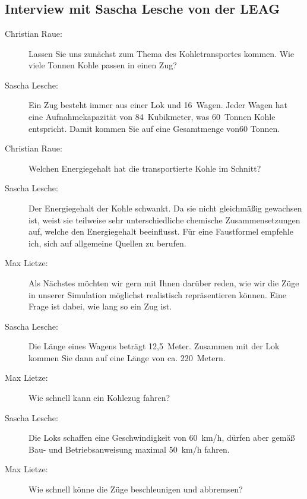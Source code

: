 \chapter{\appendixname}

\section*{Interview mit Sascha Lesche von der LEAG}

\begin{description}

    \item[Christian Raue:] Lassen Sie uns zunächst zum Thema des Kohletransportes kommen. Wie viele Tonnen Kohle passen in einen Zug?

    \item[Sascha Lesche:] Ein Zug besteht immer aus einer Lok und 16~Wagen. Jeder Wagen hat eine Aufnahmekapazität von 84~Kubikmeter, was 60~Tonnen Kohle entspricht. Damit kommen Sie auf eine Gesamtmenge von60 Tonnen.

    \item[Christian Raue:] Welchen Energiegehalt hat die transportierte Kohle im Schnitt?

    \item[Sascha Lesche:] Der Energiegehalt der Kohle schwankt. Da sie nicht gleichmäßig gewachsen ist, weist sie teilweise sehr unterschiedliche chemische Zusammensetzungen auf, welche den Energiegehalt beeinflusst. Für eine Faustformel empfehle ich, sich auf allgemeine Quellen zu berufen.

    \item[Max Lietze:] Als Nächstes möchten wir gern mit Ihnen darüber reden, wie wir die Züge in unserer Simulation möglichst realistisch repräsentieren können. Eine Frage ist dabei, wie lang so ein Zug ist.

    \item[Sascha Lesche:] Die Länge eines Wagens beträgt 12,5~Meter. Zusammen mit der Lok kommen Sie dann auf eine Länge von ca. 220~Metern.

    \item[Max Lietze:] Wie schnell kann ein Kohlezug fahren?

    \item[Sascha Lesche:] Die Loks schaffen eine Geschwindigkeit von 60~km/h, dürfen aber gemäß Bau- und Betriebsanweisung maximal 50~km/h fahren.

    \item[Max Lietze:] Wie schnell könne die Züge beschleunigen und abbremsen?


\end{description}
